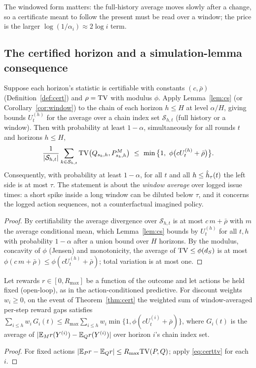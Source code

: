 The windowed form matters: the full-history average moves slowly after a change, so a certificate meant to follow the
present must be read over a window; the price is the larger $\log(1/\alpha_i)\approx2\log i$ term.

\subsection{The certified horizon and a simulation-lemma consequence}

\begin{theorem}\label{thm:cert}
Suppose each horizon's statistic is certifiable with constants $(c,\bar\rho)$ (Definition~\ref{def:cert}) and
$\rho=\mathrm{TV}$ with modulus $\phi$. Apply Lemma~\ref{lem:cs} (or Corollary~\ref{cor:window}) to the chain of each horizon
$h\le H$ at level $\alpha/H$, giving bounds $U^{(h)}_t$ for the average over a chain index set $\mathcal S_{h,t}$ (full history or a window).
Then with probability at least $1-\alpha$, simultaneously for all rounds $t$ and horizons $h\le H$,
\begin{equation}\label{eq:certtv}
\frac1{|\mathcal S_{h,t}|}\sum_{k\in\mathcal S_{h,t}}\TV\big(Q_{s_k,h},P^M_{s_k,h}\big)\ \le\ \min\big\{1,\ \phi\big(cU^{(h)}_t+\bar\rho\big)\big\}.
\end{equation}
Consequently, with probability at least $1-\alpha$, for all $t$ and all $h\le\hat h_\tau(t)$ the left side is at most $\tau$. The statement is about the \emph{window average} over logged issue times: a short spike inside a long window can be diluted below $\tau$, and it concerns the logged action sequences, not a counterfactual imagined policy.
\end{theorem}
\begin{proof}
By certifiability the average divergence over $\mathcal S_{h,t}$ is at most $c\,m+\bar\rho$ with $m$ the average conditional mean, which Lemma~\ref{lem:cs} bounds by
$U^{(h)}_t$ for all $t,h$ with probability $1-\alpha$ after a union bound over $H$ horizons. By the modulus, concavity of $\phi$ (Jensen) and monotonicity,
the average of $\mathrm{TV}\le\phi(d_S)$ is at most $\phi(c\,m+\bar\rho)\le\phi(cU^{(h)}_t+\bar\rho)$; total variation is at most one.
\end{proof}

\begin{corollary}\label{cor:value}
Let rewards $r\in[0,R_{\max}]$ be a function of the outcome and let actions be held fixed (open-loop), as in the action-conditioned predictive. For discount weights $w_i\ge0$, on the event of Theorem~\ref{thm:cert}
the weighted sum of window-averaged per-step reward gaps satisfies
$\sum_{i\le h}w_i\,G_i(t)\le R_{\max}\sum_{i\le h}w_i\min\{1,\phi(cU^{(i)}_t+\bar\rho)\}$, where $G_i(t)$ is the average of $|\mathbb{E}_M r(Y^{(i)})-\mathbb{E}_Q r(Y^{(i)})|$ over horizon $i$'s chain index set.
\end{corollary}
\begin{proof}
For fixed actions $|\mathbb{E}_Pr-\mathbb{E}_Qr|\le R_{\max}\mathrm{TV}(P,Q)$; apply \eqref{eq:certtv} for each $i$.
\end{proof}

